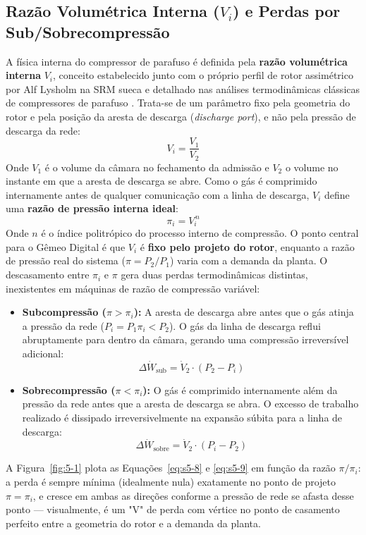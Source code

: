 \documentclass[12pt,a4paper]{article}
\numberwithin{equation}{section}
\numberwithin{table}{section}
\numberwithin{figure}{section}
\begin{document}
	\subsection{\textbf{Razão Volumétrica Interna ($V_i$) e Perdas por Sub/Sobrecompressão}}
	A física interna do compressor de parafuso é definida pela \textbf{razão volumétrica interna} $V_i$, conceito estabelecido junto com o próprio perfil de rotor assimétrico por Alf Lysholm na SRM sueca \cite{lysholm} e detalhado nas análises termodinâmicas clássicas de compressores de parafuso \cite{fleming}. Trata-se de um parâmetro fixo pela geometria do rotor e pela posição da aresta de descarga (\textit{discharge port}), e não pela pressão de descarga da rede:
	\begin{equation}\label{eq:s5-6}
 V_i = \frac{V_1}{V_2} 
\end{equation}
	Onde $V_1$ é o volume da câmara no fechamento da admissão e $V_2$ o volume no instante em que a aresta de descarga se abre. Como o gás é comprimido internamente antes de qualquer comunicação com a linha de descarga, $V_i$ define uma \textbf{razão de pressão interna ideal}:
	\begin{equation}\label{eq:s5-7}
 \pi_i = V_i^{\,n} 
\end{equation}
	Onde $n$ é o índice politrópico do processo interno de compressão. O ponto central para o Gêmeo Digital é que $V_i$ é \textbf{fixo pelo projeto do rotor}, enquanto a razão de pressão real do sistema ($\pi = P_2/P_1$) varia com a demanda da planta. O descasamento entre $\pi_i$ e $\pi$ gera duas perdas termodinâmicas distintas, inexistentes em máquinas de razão de compressão variável:
	\begin{itemize}
		\item \textbf{Subcompressão ($\pi > \pi_i$):} A aresta de descarga abre antes que o gás atinja a pressão da rede ($P_i = P_1 \pi_i < P_2$). O gás da linha de descarga reflui abruptamente para dentro da câmara, gerando uma compressão irreversível adicional:
		\begin{equation}\label{eq:s5-8}
 \Delta \dot{W}_{\text{sub}} = \dot{V}_2 \cdot (P_2 - P_i) 
\end{equation}
		\item \textbf{Sobrecompressão ($\pi < \pi_i$):} O gás é comprimido internamente além da pressão da rede antes que a aresta de descarga se abra. O excesso de trabalho realizado é dissipado irreversivelmente na expansão súbita para a linha de descarga:
		\begin{equation}\label{eq:s5-9}
 \Delta \dot{W}_{\text{sobre}} = \dot{V}_2 \cdot (P_i - P_2) 
\end{equation}
	\end{itemize}
	A Figura~\ref{fig:5-1} plota as Equações~\eqref{eq:s5-8} e \eqref{eq:s5-9} em função da razão $\pi/\pi_i$: a perda é sempre mínima (idealmente nula) exatamente no ponto de projeto $\pi=\pi_i$, e cresce em ambas as direções conforme a pressão de rede se afasta desse ponto — visualmente, é um "V" de perda com vértice no ponto de casamento perfeito entre a geometria do rotor e a demanda da planta.
\end{document}
